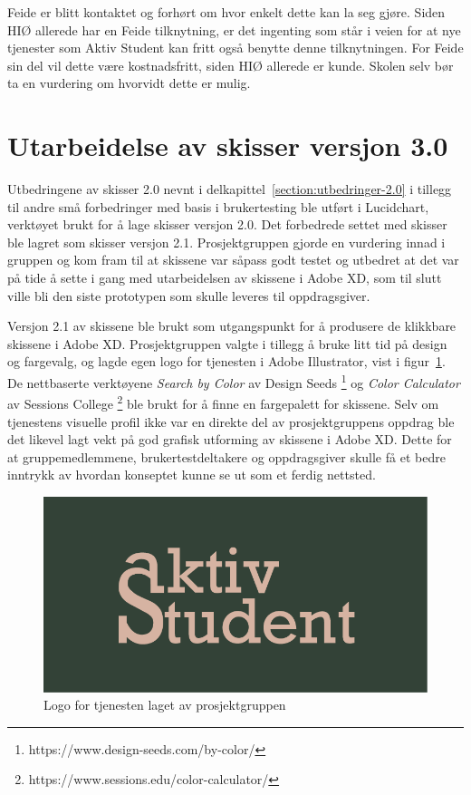 Feide er blitt kontaktet og forhørt om hvor enkelt dette kan la seg gjøre. Siden HIØ allerede har en Feide tilknytning, er det ingenting som står i veien for at nye tjenester som Aktiv Student kan fritt også benytte denne tilknytningen. For Feide sin del vil dette være kostnadsfritt, siden HIØ allerede er kunde. Skolen selv bør ta en vurdering om hvorvidt dette er mulig.


\section{Utarbeidelse av skisser versjon 3.0}

Utbedringene av skisser 2.0 nevnt i delkapittel~\ref{section:utbedringer-2.0} i tillegg til andre små forbedringer med basis i brukertesting ble utført i Lucidchart, verktøyet brukt for å lage skisser versjon 2.0. Det forbedrede settet med skisser ble lagret som skisser versjon 2.1. Prosjektgruppen gjorde en vurdering innad i gruppen og kom fram til at skissene var såpass godt testet og utbedret at det var på tide å sette i gang med utarbeidelsen av skissene i Adobe XD, som til slutt ville bli den siste prototypen som skulle leveres til oppdragsgiver.

Versjon 2.1 av skissene ble brukt som utgangspunkt for å produsere de klikkbare skissene i Adobe XD. Prosjektgruppen valgte i tillegg å bruke litt tid på design og fargevalg, og lagde egen logo for tjenesten i Adobe Illustrator, vist i figur~\ref{fig:aktivStudentLogo}. De nettbaserte verktøyene {\em  Search by Color} av Design Seeds \footnote{https://www.design-seeds.com/by-color/} og {\em  Color Calculator} av Sessions College \footnote{https://www.sessions.edu/color-calculator/} ble brukt for å finne en fargepalett for skissene. Selv om tjenestens visuelle profil ikke var en direkte del av prosjektgruppens oppdrag ble det likevel lagt vekt på god grafisk utforming av skissene i Adobe XD. Dette for at gruppemedlemmene, brukertestdeltakere og oppdragsgiver skulle få et bedre inntrykk av hvordan konseptet kunne se ut som et ferdig nettsted.

\begin{figure}[H]
\centering
\includegraphics[width=.7\textwidth]{Illustrasjoner/aktivstudentlogo.png}
\caption{Logo for tjenesten laget av prosjektgruppen}
\label{fig:aktivStudentLogo}
\end{figure}

